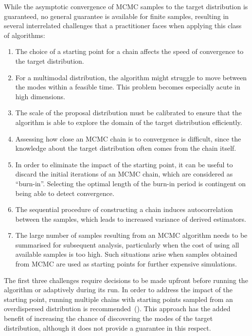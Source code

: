 \documentclass[12pt,a4paper]{report}
\begin{document}
While the asymptotic convergence of MCMC samples to the target distribution is guaranteed, no general guarantee is available for finite samples, resulting in several interrelated challenges that a practitioner faces when applying this class of algorithms:
\begin{enumerate}
\item The choice of a starting point for a chain affects the speed of convergence to the target distribution.
\item For a multimodal distribution, the algorithm might struggle to move between the modes within a feasible time. This problem becomes especially acute in high dimensions.
\item The scale of the proposal distribution must be calibrated to ensure that the algorithm is able to explore the domain of the target distribution efficiently.
\item Assessing how close an MCMC chain is to convergence is difficult, since the knowledge about the target distribution often comes from the chain itself.
\item In order to eliminate the impact of the starting point, it can be useful to discard the initial iterations of an MCMC chain, which are considered as ``burn-in''. Selecting the optimal length of the burn-in period is contingent on being able to detect convergence.
\item The sequential procedure of constructing a chain induces autocorrelation between the samples, which leads to increased variance of derived estimators.
\item The large number of samples resulting from an MCMC algorithm needs to be summarised for subsequent analysis, particularly when the cost of using all available samples is too high. Such situations arise when samples obtained from MCMC are used as starting points for further expensive simulations.
\end{enumerate}

The first three challenges require decisions to be made upfront before running the algorithm or adaptively during its run. In order to address the impact of the starting point, running multiple chains with starting points sampled from an overdispersed distribution is recommended~(\cite{gelmanInferenceIterativeSimulation1992}). This approach has the added benefit of increasing the chance of discovering the modes of the target distribution, although it does not provide a guarantee in this respect. 
\end{document}
